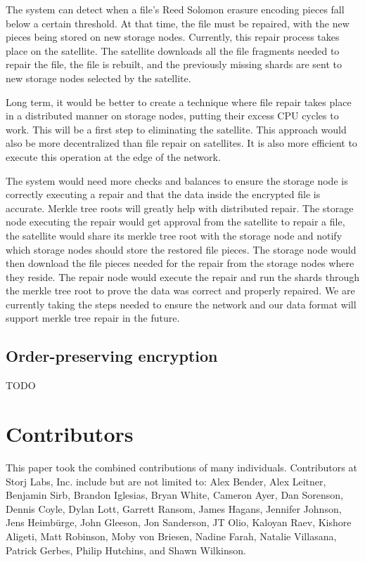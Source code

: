 \documentclass[a4paper,10pt]{article} \usepackage[utf8]{inputenc}
\newcommand{\todo}[1]{{\color{red} TODO #1 }}
\begin{document}
The system can detect when a file's Reed Solomon erasure encoding pieces fall
below a certain threshold. At that time, the file must be repaired, with
the new pieces being stored on new storage nodes.
Currently, this
repair process takes place on the satellite. The satellite downloads all
the file fragments needed to repair the file, the file is rebuilt, and the
previously missing shards are sent to new storage nodes
selected by the satellite.

Long term, it would be better to create a technique where file repair takes
place in a distributed manner on storage nodes, putting their excess CPU
cycles
to work. This will be a first step to eliminating the satellite. This
approach would also be more decentralized than file repair on satellites. It
is also more efficient to execute this operation at the edge of the network.

The system would need more checks and balances to ensure the storage node is
correctly
executing a repair and that the data inside the encrypted file is accurate.
Merkle tree roots will greatly help with distributed repair. The storage
node
executing the repair would get approval from the satellite to repair a file,
the satellite would share its merkle tree root with the storage node and
notify
which storage nodes should store the restored file pieces. The storage node
would then
download the file pieces needed for the repair from the storage nodes where they
reside. The repair node would execute the repair and run the shards
through the merkle tree root to prove the data was correct and properly
repaired. We are currently taking the steps needed to ensure the network and our
data format will support merkle tree repair in the future.

\subsection{Order-preserving encryption}

\todo{}

\section{Contributors}

This paper took the combined contributions of many individuals. Contributors
at Storj Labs, Inc. include but are not limited to:
Alex Bender,
Alex Leitner,
Benjamin Sirb,
Brandon Iglesias,
Bryan White,
Cameron Ayer,
Dan Sorenson,
Dennis Coyle,
Dylan Lott,
Garrett Ransom,
James Hagans,
Jennifer Johnson,
Jens Heimbürge,
John Gleeson,
Jon Sanderson,
JT Olio,
Kaloyan Raev,
Kishore Aligeti,
Matt Robinson,
Moby von Briesen,
Nadine Farah,
Natalie Villasana,
Patrick Gerbes,
Philip Hutchins,
and Shawn Wilkinson.
\end{document}
